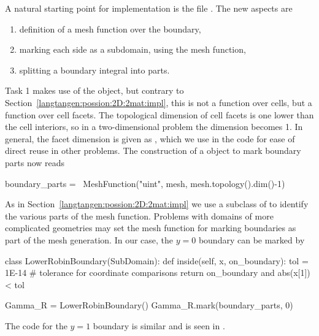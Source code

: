 A natural starting point for implementation is the
file .
The new aspects are
\begin{enumerate}
\item definition of a mesh function over the boundary,
\item marking each side as a subdomain, using the mesh function,
\item splitting a boundary integral into parts.
\end{enumerate}
Task 1 makes use of the  object, but contrary to
Section~\ref{langtangen:possion:2D:2mat:impl}, this is not a function
over cells, but a function over cell facets. The topological dimension of
cell facets is one lower than the cell interiors, so in a two-dimensional
problem the dimension becomes 1. In general, the facet dimension is given
as , which we use in the code for ease of
direct reuse in other problems.  The construction of a 
object to mark boundary parts now reads
\begin{python}
boundary_parts = \
  MeshFunction("uint", mesh, mesh.topology().dim()-1)
\end{python}
As in Section~\ref{langtangen:possion:2D:2mat:impl} we use a
subclass of  to identify the various parts of the mesh
function. Problems with domains of more complicated geometries may set
the mesh function for marking boundaries as part of the mesh generation.
In our case, the $y=0$ boundary can be marked by
\begin{python}
class LowerRobinBoundary(SubDomain):
    def inside(self, x, on_boundary):
        tol = 1E-14   # tolerance for coordinate comparisons
        return on_boundary and abs(x[1]) < tol

Gamma_R = LowerRobinBoundary()
Gamma_R.mark(boundary_parts, 0)
\end{python}
The code for the $y=1$ boundary is similar and is seen in
.

